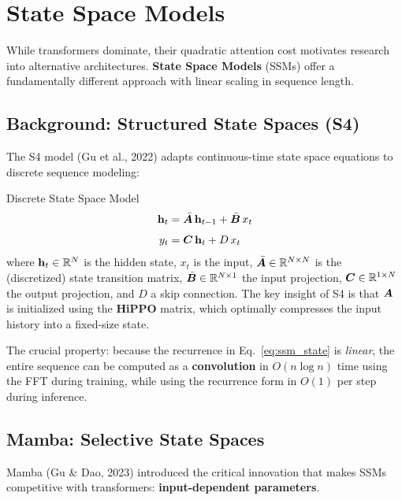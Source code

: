 \section{State Space Models}
\label{sec:ssm}

While transformers dominate, their quadratic attention cost motivates research
into alternative architectures.  \textbf{State Space Models} (SSMs) offer a
fundamentally different approach with linear scaling in sequence length.

\subsection{Background: Structured State Spaces (S4)}

The S4 model (Gu et al., 2022) adapts continuous-time state space equations
to discrete sequence modeling:

\begin{mathresult}{Discrete State Space Model}
\begin{align}
\mathbf{h}_t &= \bar{\bm{A}}\, \mathbf{h}_{t-1} + \bar{\bm{B}}\, x_t
\label{eq:ssm_state} \\[4pt]
y_t &= \bm{C}\, \mathbf{h}_t + D\, x_t
\label{eq:ssm_output}
\end{align}
where $\mathbf{h}_t \in \mathbb{R}^{N}$ is the hidden state, $x_t$ is the input,
$\bar{\bm{A}} \in \mathbb{R}^{N \times N}$ is the (discretized) state transition matrix,
$\bar{\bm{B}} \in \mathbb{R}^{N \times 1}$ the input projection, $\bm{C} \in \mathbb{R}^{1 \times N}$
the output projection, and $D$ a skip connection.  The key insight of S4 is
that $\bm{A}$ is initialized using the \textbf{HiPPO} matrix, which optimally
compresses the input history into a fixed-size state.
\end{mathresult}

The crucial property: because the recurrence in Eq.~\eqref{eq:ssm_state} is
\emph{linear}, the entire sequence can be computed as a \textbf{convolution}
in $O(n \log n)$ time using the FFT during training, while using the
recurrence form in $O(1)$ per step during inference.

\subsection{Mamba: Selective State Spaces}

Mamba (Gu \& Dao, 2023) introduced the critical innovation that makes SSMs
competitive with transformers: \textbf{input-dependent parameters}.


